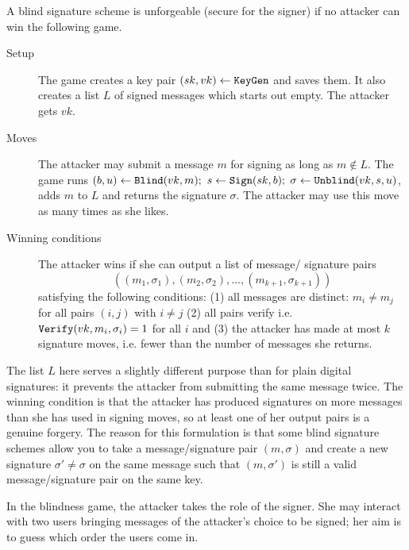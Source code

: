 \documentclass[envcountsame]{llncs}
\newcommand{\alg}[1]{\textup{\texttt{#1}}}
\begin{document}
\begin{definition}
A blind signature scheme is unforgeable (secure for the signer) if no attacker
can win the following game.

\begin{description}
\item[Setup] The game creates a key pair $(sk, vk) \gets \alg{KeyGen}$ and saves
them. It also creates a list $L$ of signed messages which starts out empty. The
attacker gets $vk$.

\item[Moves] The attacker may submit a message $m$ for signing as long as
$m \notin L$. The game runs $(b, u) \gets \alg{Blind}(vk, m);$ $s \gets
\alg{Sign}(sk, b);$ $\sigma \gets \alg{Unblind}(vk, s, u)$,
adds $m$ to $L$ and returns the signature $\sigma$. The attacker may use this
move as many times as she likes.

\item[Winning conditions] The attacker wins if she can output a list of message/
signature pairs
\[
((m_1, \sigma_1), (m_2, \sigma_2), \ldots, (m_{k+1}, \sigma_{k+1}))
\]
satisfying the following conditions: (1) all messages are distinct: $m_i \neq m_j$
for all pairs $(i, j)$ with $i \neq j$ (2) all pairs verify i.e.
$\alg{Verify}(vk, m_i, \sigma_i) = 1$ for all $i$ and
(3) the attacker has made at most $k$ signature moves, i.e. fewer than the number
of messages she returns.
\end{description}
\end{definition}

The list $L$ here serves a slightly different purpose than for plain digital
signatures: it prevents the attacker from submitting the same message twice. The
winning condition is that the attacker has produced signatures on more messages
than she has used in signing moves, so at least one of her output pairs is a
genuine forgery. The reason for this formulation is that some blind signature
schemes allow you to take a message/signature pair $(m, \sigma)$ and create a
new signature $\sigma' \neq \sigma$ on the same message such that $(m, \sigma')$
is still a valid message/signature pair on the same key.

In the blindness game, the attacker takes the role of the signer. She may
interact with two users bringing messages of the attacker's choice to be signed;
her aim is to guess which order the users come in.
\end{document}
